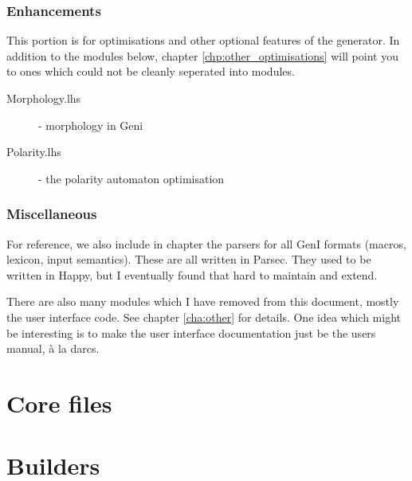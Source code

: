 \documentclass[a4paper,11pt]{report}
\begin{document}
\section{Enhancements}

This portion is for optimisations and other optional features of the
generator.
In addition to the modules below, chapter \ref{chp:other_optimisations}
will point you to ones which could not be cleanly seperated into
modules.

\begin{description}
 \item[Morphology.lhs] - morphology in Geni  
 \item[Polarity.lhs]   - the polarity automaton optimisation 
\end{description}

\section{Miscellaneous}

For reference, we also include in chapter \label{cha:GeniParsers} the
parsers for all GenI formats (macros, lexicon, input semantics).  These
are all written in Parsec.  They used to be written in Happy, but I
eventually found that hard to maintain and extend.

There are also many modules which I have removed from this document,
mostly the user interface code.  See chapter \ref{cha:other} for
details.  One idea which might be interesting is to make the user
interface documentation just be the users manual, \`a la darcs.




\part{Core files}






\part{Builders}
\label{prt:builders}
\end{document}
